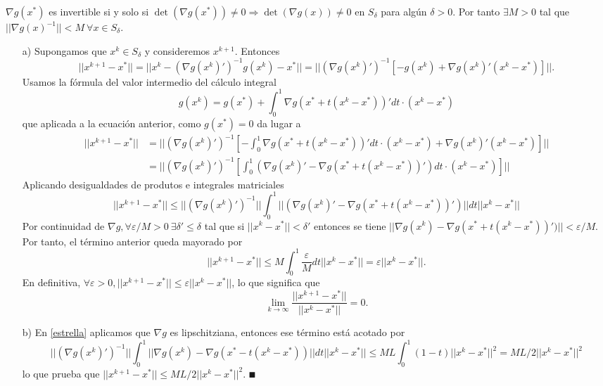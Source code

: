 \documentclass[MIOP.tex]{subfiles}
\begin{document}
\begin{dem}
$\nabla g(x^*)$ es invertible si y solo si $\det(\nabla g(x^*))\neq 0\Rightarrow\det(\nabla g(x))\neq 0$ en $S_\delta$ para algún $\delta>0$. Por tanto $\exists M>0$ tal que $||\nabla g(x)^{-1}||<M\ \forall x\in S_\delta$. 
\begin{itemize}
\item[a)] Supongamos que $x^k\in S_\delta$ y consideremos $x^{k+1}$. Entonces
$$||x^{k+1}-x^*||=||x^k-(\nabla g(x^k)')^{-1}g(x^k)-x^*||=||(\nabla g(x^k)')^{-1}[-g(x^k)+\nabla g(x^k)'(x^k-x^*)]||.$$
Usamos la fórmula del valor intermedio del cálculo integral
$$g(x^k)=g(x^*)+\int_0^1\nabla g(x^*+t(x^k-x^*))'dt\cdot(x^k-x^*)$$
que aplicada a la ecuación anterior, como $g(x^*)=0$  da lugar a
\begin{align*}
||x^{k+1}-x^*||&=||(\nabla g(x^k)')^{-1}\left[-\int_0^1\nabla g(x^*+t(x^k-x^*))'dt\cdot(x^k-x^*)+\nabla g(x^k)'(x^k-x^*)\right]||\\
&=||(\nabla g(x^k)')^{-1}\left[\int_0^1(\nabla g(x^k)'-\nabla g(x^*+t(x^k-x^*))')dt\cdot(x^k-x^*)\right]||
\end{align*}
Aplicando desigualdades de produtos e integrales matriciales
\begin{equation}\label{estrella}
||x^{k+1}-x^*||\leq||(\nabla g(x^k)')^{-1}||\int_0^1||(\nabla g(x^k)'-\nabla g(x^*+t(x^k-x^*))')||dt||x^k-x^*||
\end{equation}
Por continuidad de $\nabla g, \forall\varepsilon/M>0\ \exists\delta'\leq\delta$ tal que si $||x^k-x^*||<\delta'$ entonces se tiene $ ||\nabla g(x^k)-\nabla g(x^*+t(x^k-x^*))')||<\varepsilon/M$. Por tanto, el término anterior queda mayorado por
$$||x^{k+1}-x^*|| \leq M\int_0^1\frac{\varepsilon}{M} dt ||x^k-x^*||=\varepsilon ||x^k-x^*||.$$
En definitiva, $\forall\varepsilon>0, ||x^{k+1}-x^*||\leq\varepsilon||x^k-x^*||$, lo que significa que $$\lim_{k\to\infty}\frac{||x^{k+1}-x^*||}{||x^k-x^*||}=0.$$
\item[b)] En \ref{estrella} aplicamos que $\nabla g$ es lipschitziana, entonces ese término está acotado por
$$||(\nabla g(x^k)')^{-1}||\int_0^1||\nabla g(x^k)-\nabla g(x^*-t(x^k-x^*))||dt||x^k-x^*||\leq ML\int_0^1 (1-t)||x^k-x^*||^2=ML/2||x^k-x^*||^2$$
lo que prueba que $ ||x^{k+1}-x^*||\leq ML/2||x^k-x^*||^2$. $\QED$
\end{itemize}
\end{dem}
\end{document}
